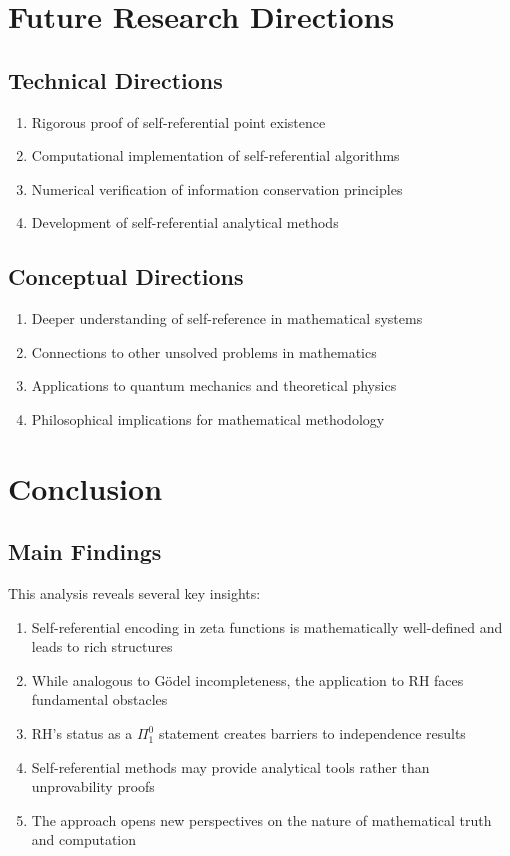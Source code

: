 \documentclass[12pt]{article}
\theoremstyle{plain}
\theoremstyle{definition}
\begin{document}
\section{Future Research Directions}

\subsection{Technical Directions}

\begin{enumerate}
\item Rigorous proof of self-referential point existence
\item Computational implementation of self-referential algorithms
\item Numerical verification of information conservation principles
\item Development of self-referential analytical methods
\end{enumerate}

\subsection{Conceptual Directions}

\begin{enumerate}
\item Deeper understanding of self-reference in mathematical systems
\item Connections to other unsolved problems in mathematics
\item Applications to quantum mechanics and theoretical physics
\item Philosophical implications for mathematical methodology
\end{enumerate}

\section{Conclusion}

\subsection{Main Findings}

This analysis reveals several key insights:

\begin{enumerate}
\item Self-referential encoding in zeta functions is mathematically well-defined and leads to rich structures
\item While analogous to Gödel incompleteness, the application to RH faces fundamental obstacles
\item RH's status as a $\Pi_1^0$ statement creates barriers to independence results
\item Self-referential methods may provide analytical tools rather than unprovability proofs
\item The approach opens new perspectives on the nature of mathematical truth and computation
\end{enumerate}
\end{document}

